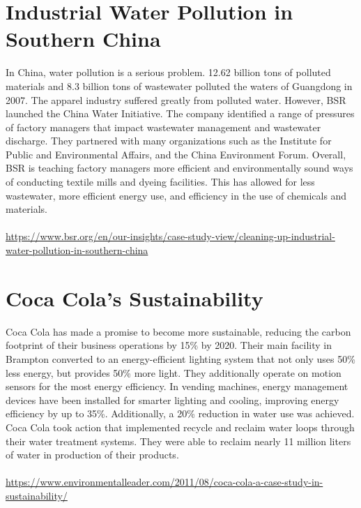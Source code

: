 \documentclass{article}
\begin{document}
\begin{spacing}{2.15}
    \section{Industrial Water Pollution in Southern China}
    \indent In China, water pollution is a serious problem. 12.62 billion tons of polluted materials and 8.3 billion tons of wastewater polluted the waters of Guangdong in 2007. The apparel industry suffered greatly from polluted water. However, BSR launched the China Water Initiative. The company identified a range of pressures of factory managers that impact wastewater management and wastewater discharge. They partnered with many organizations such as the Institute for Public and Environmental Affairs, and the China Environment Forum. Overall, BSR is teaching factory managers more efficient and environmentally sound ways of conducting textile mills and dyeing facilities. This has allowed for less wastewater, more efficient energy use, and efficiency in the use of chemicals and materials.\\\\
    \url{https://www.bsr.org/en/our-insights/case-study-view/cleaning-up-industrial-water-pollution-in-southern-china}
    \section{Coca Cola's Sustainability}
    \indent Coca Cola has made a promise to become more sustainable, reducing the carbon footprint of their business operations by 15\% by 2020. Their main facility in Brampton converted to an energy-efficient lighting system that not only uses 50\% less energy, but provides 50\% more light. They additionally operate on motion sensors for the most energy efficiency. In vending machines, energy management devices have been installed for smarter lighting and cooling, improving energy efficiency by up to 35\%. Additionally, a 20\% reduction in water use was achieved. Coca Cola took action that implemented recycle and reclaim water loops through their water treatment systems. They were able to reclaim nearly 11 million liters of water in production of their products.\\\\
    \url{https://www.environmentalleader.com/2011/08/coca-cola-a-case-study-in-sustainability/}
    \newpage

\end{spacing}
\end{document}
